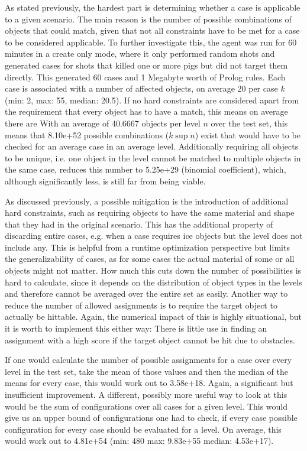 As stated previously, the hardest part is determining whether a case is applicable to a given scenario.
The main reason is the number of possible combinations of objects that could match, given that not all constraints have to be met for a case to be considered applicable.
To further investigate this, the agent was run for 60 minutes in a create only mode, where it only performed random shots and generated cases for shots that killed one or more pigs but did not target them directly.
This generated 60 cases and 1 Megabyte worth of Prolog rules. Each case is associated with a number of affected objects, on average 20 per case $k$ (min: 2, max: 55, median: 20.5).
If no hard constraints are considered apart from the requirement that every object has to have a match, this means on average there are
With an average of 40.6667 objects per level $n$ over the test set, this means that
8.10e+52 possible combinations ($k\sup{n}$) exist that would have to be checked for an average case in an average level.
Additionally requiring all objects to be unique, i.e. one object in the level cannot be matched to multiple objects in the same case, reduces this number to
5.25e+29 (binomial coefficient), which, although significantly less, is still far from being viable.

As discussed previously, a possible mitigation is the introduction of additional hard constraints, such as requiring objects to have the same material and shape that they had in the original scenario.
This has the additional property of discarding entire cases, e.g. when a case requires ice objects but the level does not include any.
This is helpful from a runtime optimization perspective but limits the generalizability of cases, as for some cases the actual material of some or all objects might not matter.
How much this cuts down the number of possibilities is hard to calculate, since it depends on the distribution of object types in the levels and therefore cannot be averaged over the entire set as easily.
Another way to reduce the number of allowed assignments is to require the target object to actually be hittable.
Again, the numerical impact of this is highly situational, but it is worth to implement this either way:
There is little use in finding an assignment with a high score if the target object cannot be hit due to obstacles.

If one would calculate the number of possible assignments for a case over every level in the test set, take the mean of those values and then the median of the means for every case, this would work out to 3.58e+18. Again, a significant but insufficient improvement.
A different, possibly more useful way to look at this would be the sum of configurations over all cases for a given level. This would give us an upper bound of configurations one had to check, if every case possible configuration for every case should be evaluated for a level. On average, this would work out to 4.81e+54 (min: 480 max: 9.83e+55 median: 4.53e+17).


